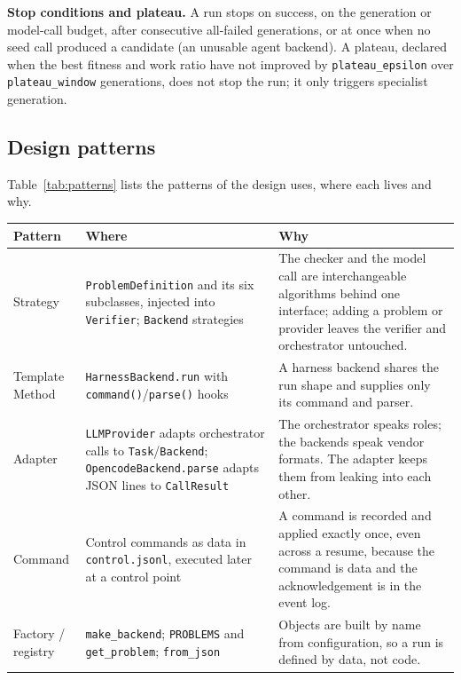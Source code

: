 \textbf{Stop conditions and plateau.} A run stops on success, on the generation
or model-call budget, after consecutive all-failed generations, or at once when
no seed call produced a candidate (an unusable agent backend). A plateau,
declared when the best fitness and work ratio have not improved by
\texttt{plateau\_epsilon} over \texttt{plateau\_window} generations, does not
stop the run; it only triggers specialist generation.

\subsection{Design patterns}

Table~\ref{tab:patterns} lists the patterns of \citet{gamma1994design} the
design uses, where each lives and why.

\begin{table}[H]
  \centering
  \scriptsize
  \setlength{\tabcolsep}{4pt}
  \begin{tabular}{@{}p{}p{}p{}@{}}
  \toprule
  \textbf{Pattern} & \textbf{Where} & \textbf{Why} \\
  \midrule
  Strategy & \texttt{ProblemDefinition} and its six subclasses, injected into \texttt{Verifier}; \texttt{Backend} strategies & The checker and the model call are interchangeable algorithms behind one interface; adding a problem or provider leaves the verifier and orchestrator untouched. \\
  Template Method & \texttt{HarnessBackend.run} with \texttt{command()}/\texttt{parse()} hooks & A harness backend shares the run shape and supplies only its command and parser. \\
  Adapter & \texttt{LLMProvider} adapts orchestrator calls to \texttt{Task}/\texttt{Backend}; \texttt{OpencodeBackend.parse} adapts JSON lines to \texttt{CallResult} & The orchestrator speaks roles; the backends speak vendor formats. The adapter keeps them from leaking into each other. \\
  Command & Control commands as data in \texttt{control.jsonl}, executed later at a control point & A command is recorded and applied exactly once, even across a resume, because the command is data and the acknowledgement is in the event log. \\
  Factory / registry & \texttt{make\_backend}; \texttt{PROBLEMS} and \texttt{get\_problem}; \texttt{from\_json} & Objects are built by name from configuration, so a run is defined by data, not code. \\

\end{tabular}
\end{table}
